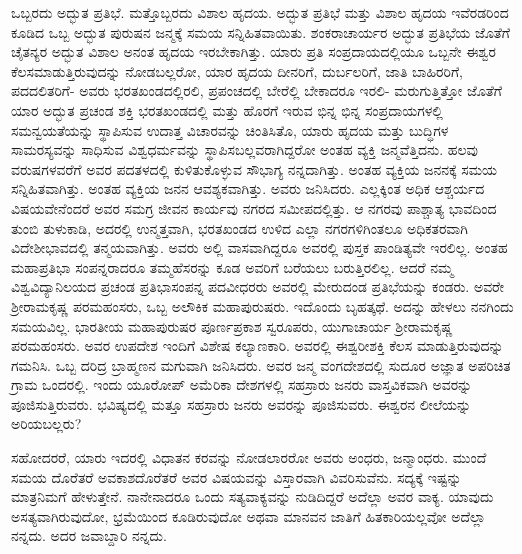 ಒಬ್ಬರದು ಅದ್ಭುತ ಪ್ರತಿಭೆ. ಮತ್ತೊಬ್ಬರದು ವಿಶಾಲ ಹೃದಯ. ಅದ್ಭುತ ಪ್ರತಿಭೆ ಮತ್ತು ವಿಶಾಲ ಹೃದಯ ಇವೆರಡರಿಂದ ಕೂಡಿದ ಒಬ್ಬ ಅದ್ಭುತ ಪುರುಷನ ಜನ್ಮಕ್ಕೆ ಸಮಯ ಸನ್ನಿಹಿತವಾಯಿತು. ಶಂಕರಾಚಾರ್ಯರ ಅದ್ಭುತ ಪ್ರತಿಭೆಯ ಜೊತೆಗೆ ಚೈತನ್ಯರ ಅದ್ಭುತ ವಿಶಾಲ ಅನಂತ ಹೃದಯ ಇರಬೇಕಾಗಿತ್ತು. ಯಾರು ಪ್ರತಿ ಸಂಪ್ರದಾಯದಲ್ಲಿಯೂ ಒಬ್ಬನೇ ಈಶ್ವರ ಕೆಲಸಮಾಡುತ್ತಿರುವುದನ್ನು ನೋಡಬಲ್ಲರೋ, ಯಾರ ಹೃದಯ ದೀನರಿಗೆ, ದುರ್ಬಲರಿಗೆ, ಜಾತಿ ಬಾಹಿರ\-ರಿಗೆ, ಪದದಲಿತರಿಗೆ- ಅವರು ಭರತಖಂಡದಲ್ಲಿರಲಿ, ಪ್ರಪಂಚದಲ್ಲಿ ಬೇರೆಲ್ಲಿ ಬೇಕಾದರೂ ಇರಲಿ- ಮರುಗುತ್ತಿತ್ತೋ ಜೊತೆಗೆ ಯಾರ ಅದ್ಭುತ ಪ್ರಚಂಡ ಶಕ್ತಿ ಭರತಖಂಡದಲ್ಲಿ ಮತ್ತು ಹೊರಗೆ ಇರುವ ಭಿನ್ನ ಭಿನ್ನ ಸಂಪ್ರದಾಯಗಳಲ್ಲಿ ಸಮನ್ವಯತೆಯನ್ನು ಸ್ಥಾಪಿಸುವ ಉದಾತ್ತ ವಿಚಾರವನ್ನು ಚಿಂತಿಸಿತೊ, ಯಾರು ಹೃದಯ ಮತ್ತು ಬುದ್ಧಿಗಳ ಸಾಮರಸ್ಯವನ್ನು ಸಾಧಿಸುವ ವಿಶ್ವಧರ್ಮವನ್ನು ಸ್ಥಾಪಿಸಬಲ್ಲವರಾಗಿದ್ದರೋ ಅಂತಹ ವ್ಯಕ್ತಿ ಜನ್ಮವೆತ್ತಿದನು. ಹಲವು ವರುಷಗಳವರೆಗೆ ಅವರ ಪದತಳದಲ್ಲಿ ಕುಳಿತುಕೊಳ್ಳುವ ಸೌಭಾಗ್ಯ ನನ್ನದಾಗಿತ್ತು. ಅಂತಹ ವ್ಯಕ್ತಿಯ ಜನನಕ್ಕೆ ಸಮಯ ಸನ್ನಿಹಿತವಾಗಿತ್ತು. ಅಂತಹ ವ್ಯಕ್ತಿಯ ಜನನ ಆವಶ್ಯಕವಾಗಿತ್ತು. ಅವರು ಜನಿಸಿದರು. ಎಲ್ಲಕ್ಕಿಂತ ಅಧಿಕ ಆಶ್ಚರ್ಯದ ವಿಷಯವೇನೆಂದರೆ ಅವರ ಸಮಗ್ರ ಜೀವನ ಕಾರ್ಯವು ನಗರದ ಸಮೀಪದಲ್ಲಿತ್ತು. ಆ ನಗರವು ಪಾಶ್ಚಾತ್ಯ ಭಾವದಿಂದ ತುಂಬಿ ತುಳುಕಾಡಿ, ಅದರಲ್ಲಿ ಉನ್ಮತ್ತವಾಗಿ, ಭರತಖಂಡದ ಉಳಿದ ಎಲ್ಲಾ ನಗರಗಳಿಗಿಂತಲೂ ಅಧಿಕತರವಾಗಿ ವಿದೇಶೀ\break ಭಾವದಲ್ಲಿ ತನ್ಮಯವಾಗಿತ್ತು. ಅವರು ಅಲ್ಲಿ ವಾಸವಾಗಿದ್ದರೂ ಅವರಲ್ಲಿ ಪುಸ್ತಕ ಪಾಂಡಿತ್ಯವೇ ಇರಲಿಲ್ಲ. ಅಂತಹ ಮಹಾಪ್ರತಿಭಾ ಸಂಪನ್ನರಾದರೂ ತಮ್ಮ\break ಹೆಸರನ್ನು ಕೂಡ ಅವರಿಗೆ ಬರೆಯಲು ಬರುತ್ತಿರಲಿಲ್ಲ. ಆದರೆ ನಮ್ಮ ವಿಶ್ವವಿದ್ಯಾನಿಲಯದ ಪ್ರಚಂಡ ಪ್ರತಿಭಾಸಂಪನ್ನ ಪದವೀಧರರು ಅವರಲ್ಲಿ ಮೇರುದಂಡ ಪ್ರತಿಭೆಯನ್ನು ಕಂಡರು. ಅವರೇ ಶ‍್ರೀರಾಮಕೃಷ್ಣ ಪರಮಹಂಸರು, ಒಬ್ಬ ಅಲೌಕಿಕ ಮಹಾಪುರುಷರು. ಇದೊಂದು ಬೃಹತ್ಕಥೆ. ಅದನ್ನು ಹೇಳಲು ನನಗಿಂದು ಸಮಯವಿಲ್ಲ. ಭಾರತೀಯ ಮಹಾಪುರುಷರ ಪೂರ್ಣಪ್ರಕಾಶ ಸ್ವರೂಪರು, ಯುಗಾಚಾರ್ಯ ಶ‍್ರೀರಾಮಕೃಷ್ಣ ಪರಮಹಂಸರು. ಅವರ ಉಪದೇಶ ಇಂದಿಗೆ ವಿಶೇಷ ಕಲ್ಯಾಣಕಾರಿ. ಅವರಲ್ಲಿ ಈಶ್ವರೀಶಕ್ತಿ ಕೆಲಸ ಮಾಡುತ್ತಿರುವುದನ್ನು ಗಮನಿಸಿ. ಒಬ್ಬ ದರಿದ್ರ ಬ್ರಾಹ್ಮಣನ ಮಗುವಾಗಿ ಜನಿಸಿದರು. ಅವರ ಜನ್ಮ ವಂಗದೇಶದಲ್ಲಿ ಸುದೂರ ಅಜ್ಞಾತ ಅಪರಿಚಿತ ಗ್ರಾಮ ಒಂದರಲ್ಲಿ. ಇಂದು ಯೂರೋಪ್​ ಅಮೆರಿಕಾ ದೇಶಗಳಲ್ಲಿ ಸಹಸ್ರಾರು ಜನರು ವಾಸ್ತವಿಕವಾಗಿ ಅವರನ್ನು ಪೂಜಿಸುತ್ತಿರುವರು. ಭವಿಷ್ಯದಲ್ಲಿ ಮತ್ತೂ ಸಹಸ್ರಾರು ಜನರು ಅವರನ್ನು ಪೂಜಿಸುವರು. ಈಶ್ವರನ ಲೀಲೆಯನ್ನು ಅರಿಯಬಲ್ಲರು?

ಸಹೋದರರೆ, ಯಾರು ಇದರಲ್ಲಿ ವಿಧಾತನ ಕರವನ್ನು ನೋಡಲಾರರೋ ಅವರು ಅಂಧರು, ಜನ್ಮಾಂಧರು. ಮುಂದೆ ಸಮಯ ದೊರೆತರೆ ಅವಕಾಶ\break ದೊರೆತರೆ ಅವರ ವಿಷಯವನ್ನು ವಿಸ್ತಾರವಾಗಿ ವಿವರಿಸುವೆನು. ಸದ್ಯಕ್ಕೆ ಇಷ್ಟನ್ನು ಮಾತ್ರನಿಮಗೆ ಹೇಳುತ್ತೇನೆ. ನಾನೇನಾದರೂ ಒಂದು ಸತ್ಯವಾಕ್ಯವನ್ನು ನುಡಿದಿದ್ದರೆ ಅದೆಲ್ಲಾ ಅವರ ವಾಕ್ಯ. ಯಾವುದು ಅಸತ್ಯವಾಗಿರುವುದೋ, ಭ್ರಮೆಯಿಂದ ಕೂಡಿರುವುದೋ ಅಥವಾ ಮಾನವನ ಜಾತಿಗೆ ಹಿತಕಾರಿಯಲ್ಲವೋ ಅದೆಲ್ಲಾ ನನ್ನದು. ಅದರ ಜವಾಬ್ದಾರಿ ನನ್ನದು.

